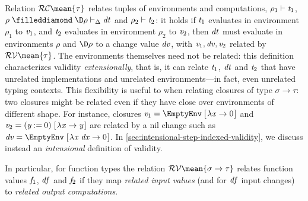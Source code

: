 Relation \ensuremath{\mathcal{RC}\mean{\tau}} relates tuples of environments and
computations,
\ensuremath{\rho_{1}\vdash\Varid{t}_{1}}, \ensuremath{\rho\mathrel{\filleddiamond}\D\rho\vdash_{\Delta}\Varid{dt}} and \ensuremath{\rho_{2}\vdash\Varid{t}_{2}}: it holds
if \ensuremath{\Varid{t}_{1}} evaluates in environment \ensuremath{\rho_{1}} to \ensuremath{\Varid{v}_{1}},
and \ensuremath{\Varid{t}_{2}} evaluates in environment \ensuremath{\rho_{2}} to \ensuremath{\Varid{v}_{2}}, then
\ensuremath{\Varid{dt}} must evaluate in environments \ensuremath{\rho} and \ensuremath{\D\rho} to a change
value \ensuremath{\Varid{dv}}, with \ensuremath{\Varid{v}_{1},\Varid{dv},\Varid{v}_{2}} related by \ensuremath{\mathcal{RV}\mean{\tau}}.
The environments themselves need not be related: this definition
characterizes validity \emph{extensionally}, that is, it can relate
\ensuremath{\Varid{t}_{1}}, \ensuremath{\Varid{dt}} and \ensuremath{\Varid{t}_{2}} that have unrelated implementations and
unrelated environments---in fact, even unrelated typing contexts.
This flexibility is useful to when relating closures of type
\ensuremath{\sigma\to \tau}: two closures might be related even if they have
close over environments of different shape. For instance,
closures \ensuremath{\Varid{v}_{1}\mathrel{=}\EmptyEnv\;[\mskip1.5mu \lambda \Varid{x}\to \mathrm{0}\mskip1.5mu]} and \ensuremath{\Varid{v}_{2}\mathrel{=}(\Varid{y}\mathbin{:=}\mathrm{0})\;[\mskip1.5mu \lambda \Varid{x}\to \Varid{y}\mskip1.5mu]} are
related by a nil change such as \ensuremath{\Varid{dv}\mathrel{=}\EmptyEnv\;[\mskip1.5mu \lambda \Varid{x}\;\Varid{dx}\to \mathrm{0}\mskip1.5mu]}.
In \cref{sec:intensional-step-indexed-validity}, we discuss instead
an \emph{intensional} definition of validity.

In particular, for function types the relation \ensuremath{\mathcal{RV}\mean{\sigma\to \tau}} relates function values \ensuremath{\Varid{f}_{1}}, \ensuremath{\Varid{df}} and \ensuremath{\Varid{f}_{2}} if they map
\emph{related input values} (and for \ensuremath{\Varid{df}} input changes) to
\emph{related output computations}.

